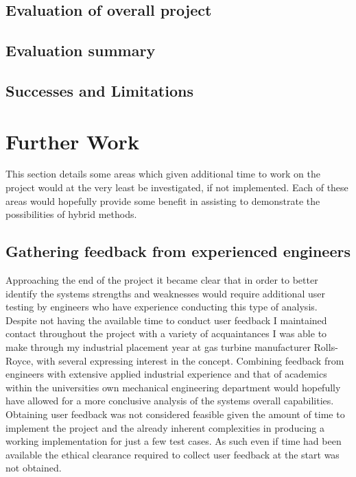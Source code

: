 \documentclass{article}
\begin{document}
\subsection{Evaluation of overall project}

% 


\subsection{Evaluation summary}

\subsection{Successes and Limitations}


\section{Further Work}
This section details some areas which given additional time to work on the project would at the very least be investigated, if not implemented. Each of these areas would hopefully provide some benefit in assisting to demonstrate the possibilities of hybrid methods.

\subsection{Gathering feedback from experienced engineers}
Approaching the end of the project it became clear that in order to better identify the systems strengths and weaknesses would require additional user testing by engineers who have experience conducting this type of analysis. Despite not having the available time to conduct user feedback I maintained contact throughout the project with a variety of acquaintances I was able to make through my industrial placement year at gas turbine manufacturer Rolls-Royce, with several expressing interest in the concept. Combining feedback from engineers with extensive applied industrial experience and that of academics within the universities own mechanical engineering department would hopefully have allowed for a more conclusive analysis of the systems overall capabilities. Obtaining user feedback was not considered feasible given the amount of time to implement the project and the already inherent complexities in producing a working implementation for just a few test cases. As such even if time had been available the ethical clearance required to collect user feedback at the start was not obtained.
\end{document}
